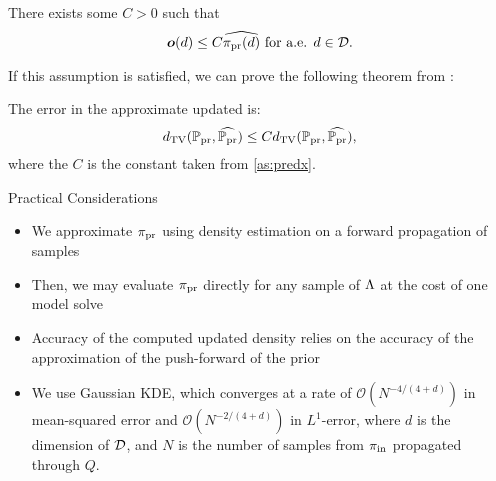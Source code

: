 \begin{frame}[t]
\begin{assumption}\label{as:predx}
There exists some $C>0$ such that
\[
\operatorname*{\boldsymbol{o}} (d) \leq C \widehat{\operatorname*{\pi_{pr}}(d)} \text{ for a.e. } d\in \mathcal{D}.
\]
\end{assumption}

If this assumption is satisfied, we can prove the following theorem from \cite{BJW18}:

\begin{theorem}
The error in the approximate updated is:
\begin{equation}\label{eq:pred_bound}
d_{\text{TV}} (\operatorname*{\mathbb{P}_{pr}}, \widehat{\operatorname*{\mathbb{P}_{pr}}}) \leq C d_{\text{TV}} (\operatorname*{\mathbb{P}_{pr}}, \widehat{\operatorname*{\mathbb{P}_{pr}}}),
\end{equation}
where the $C$ is the constant taken from \eqref{as:predx}.
\end{theorem}

\end{frame}


\begin{frame}[t]{Practical Considerations}

\begin{itemize}
	\item We approximate $\operatorname*{\pi_{pr}}$ using density estimation on a forward propagation of samples
	\item Then, we may evaluate $\operatorname*{\pi_{pr}}$ directly for any sample of ${\Lambda}$ at the cost of one model solve
	\item Accuracy of the computed updated density relies on the accuracy of the approximation of the push-forward of the prior
	\item We use Gaussian KDE, which converges at a rate of $\mathcal{O}(N^{-4/(4+d)})$ in mean-squared error and $\mathcal{O}(N^{-2/(4+d)})$ in $L^1$-error, where $d$ is the dimension of $\mathcal{D}$, and $N$ is the number of samples from $\operatorname*{\pi_{in}}$ propagated through $Q$.

\end{itemize}
\end{frame}
